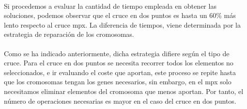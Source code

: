 	\paragraph{}Si procedemos a evaluar la cantidad de tiempo empleada en obtener las soluciones, podemos observar que el cruce en dos puntos es hasta un 60\% más lento respecto al cruce mpx. La diferencia de tiempos, viene determinada por la estrategia de reparación de los cromosomas.
	
	\paragraph{}Como se ha indicado anteriormente, dicha estrategia difiere según el tipo de cruce. Para el cruce en dos puntos se necesita recorrer todos los elementos no seleccionados, e ir evaluando el coste que aportan, este proceso se repite hasta que los cromosomas tengan los genes necesarios, sin embargo, en el mpx solo necesitamos eliminar elementos del cromosoma que menos aportan. Por tanto, el número de operaciones necesarias es mayor en el caso del cruce en dos puntos.
	
	
	
	
	

	
	\paragraph{} 
	
